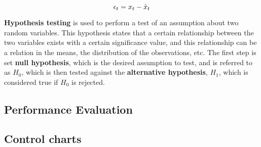 \begin {equation*}
\centering
\epsilon_t = x_t - \hat{x}_t
\end {equation*}

\par \textbf{Hypothesis testing} is used to perform a test of an assumption about two random variables. This hypothesis states that a certain relationship between the two variables exists with a certain significance value, and this
relationship can be a relation in the means, the distribution of the observations, etc. The first step is set \textbf{null hypothesis}, which is the desired assumption to test, and is referred to as $H_0$, which is then tested
against the \textbf{alternative hypothesis}, $H_1$, which is considered true if $H_0$ is rejected. 

\subsection {Performance Evaluation}

\subsection {Control charts}
